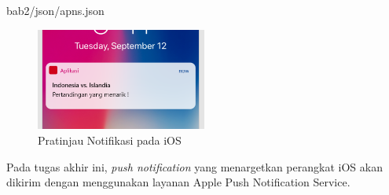  {bab2/json/apns.json}
\begin{figure}[H]
	\centering\includegraphics[width=0.5\textwidth]{bab2/img/apns.png}
	\caption{Pratinjau Notifikasi pada iOS}
	\label{img:contoh-hasil-apns}
\end{figure}
\par Pada tugas akhir ini, \textit{push notification} yang menargetkan perangkat iOS akan dikirim dengan menggunakan layanan Apple Push Notification Service.

